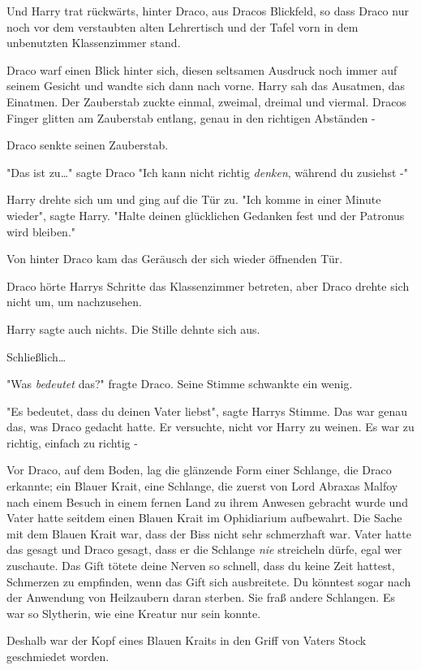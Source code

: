 {Und Harry trat rückwärts, hinter Draco, aus Dracos Blickfeld, so dass Draco nur noch vor dem verstaubten alten Lehrertisch und der Tafel vorn in dem unbenutzten Klassenzimmer stand.

Draco warf einen Blick hinter sich, diesen seltsamen Ausdruck noch immer auf seinem Gesicht und wandte sich dann nach vorne. Harry sah das Ausatmen, das Einatmen. Der Zauberstab zuckte einmal, zweimal, dreimal und viermal. Dracos Finger glitten am Zauberstab entlang, genau in den richtigen Abständen -

Draco senkte seinen Zauberstab.

"Das ist zu…" sagte Draco "Ich kann nicht richtig \emph{denken}, während du zusiehst -"

Harry drehte sich um und ging auf die Tür zu. "Ich komme in einer Minute wieder", sagte Harry. "Halte deinen glücklichen Gedanken fest und der Patronus wird bleiben."

Von hinter Draco kam das Geräusch der sich wieder öffnenden Tür.

Draco hörte Harrys Schritte das Klassenzimmer betreten, aber Draco drehte sich nicht um, um nachzusehen.

Harry sagte auch nichts. Die Stille dehnte sich aus.

Schließlich…

"Was \emph{bedeutet} das?" fragte Draco. Seine Stimme schwankte ein wenig.

"Es bedeutet, dass du deinen Vater liebst", sagte Harrys Stimme. Das war genau das, was Draco gedacht hatte. Er versuchte, nicht vor Harry zu weinen. Es war zu richtig, einfach zu richtig -

Vor Draco, auf dem Boden, lag die glänzende Form einer Schlange, die Draco erkannte; ein Blauer Krait, eine Schlange, die zuerst von Lord Abraxas Malfoy nach einem Besuch in einem fernen Land zu ihrem Anwesen gebracht wurde und Vater hatte seitdem einen Blauen Krait im Ophidiarium aufbewahrt. Die Sache mit dem Blauen Krait war, dass der Biss nicht sehr schmerzhaft war. Vater hatte das gesagt und Draco gesagt, dass er die Schlange \emph{nie} streicheln dürfe, egal wer zuschaute. Das Gift tötete deine Nerven so schnell, dass du keine Zeit hattest, Schmerzen zu empfinden, wenn das Gift sich ausbreitete. Du könntest sogar nach der Anwendung von Heilzaubern daran sterben. Sie fraß andere Schlangen. Es war so Slytherin, wie eine Kreatur nur sein konnte.

Deshalb war der Kopf eines Blauen Kraits in den Griff von Vaters Stock geschmiedet worden.

}

